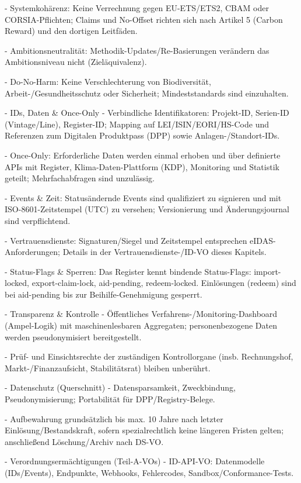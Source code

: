 \documentclass[12pt,a4paper]{scrartcl}
\begin{document}
- Systemkohärenz: Keine Verrechnung gegen EU-ETS/ETS2, CBAM oder CORSIA-Pflichten; Claims und No-Offset richten sich nach Artikel 5 (Carbon Reward) und den dortigen Leitfäden.

- Ambitionsneutralität: Methodik-Updates/Re-Basierungen verändern das Ambitionsniveau nicht (Zieläquivalenz).

- Do-No-Harm: Keine Verschlechterung von Biodiversität, Arbeit-/Gesundheitsschutz oder Sicherheit; Mindeststandards sind einzuhalten.

- IDs, Daten \& Once-Only
- Verbindliche Identifikatoren: Projekt-ID, Serien-ID (Vintage/Line), Register-ID; Mapping auf LEI/ISIN/EORI/HS-Code und Referenzen zum Digitalen Produktpass (DPP) sowie Anlagen-/Standort-IDs.

- Once-Only: Erforderliche Daten werden einmal erhoben und über definierte APIs mit Register, Klima-Daten-Plattform (KDP), Monitoring und Statistik geteilt; Mehrfachabfragen sind unzulässig.

- Events \& Zeit: Statusändernde Events sind qualifiziert zu signieren und mit ISO-8601-Zeitstempel (UTC) zu versehen; Versionierung und Änderungsjournal sind verpflichtend.

- Vertrauensdienste: Signaturen/Siegel und Zeitstempel entsprechen eIDAS-Anforderungen; Details in der Vertrauensdienste-/ID-VO dieses Kapitels.

- Status-Flags \& Sperren: Das Register kennt bindende Status-Flags: import-locked, export-claim-lock, aid-pending, redeem-locked. Einlösungen (redeem) sind bei aid-pending bis zur Beihilfe-Genehmigung gesperrt.

- Transparenz \& Kontrolle
- Öffentliches Verfahrens-/Monitoring-Dashboard (Ampel-Logik) mit maschinenlesbaren Aggregaten; personenbezogene Daten werden pseudonymisiert bereitgestellt.

- Prüf- und Einsichtsrechte der zuständigen Kontrollorgane (insb. Rechnungshof, Markt-/Finanzaufsicht, Stabilitätsrat) bleiben unberührt.

- Datenschutz (Querschnitt)
- Datensparsamkeit, Zweckbindung, Pseudonymisierung; Portabilität für DPP/Registry-Belege.

- Aufbewahrung grundsätzlich bis max. 10 Jahre nach letzter Einlösung/Bestandskraft, sofern spezialrechtlich keine längeren Fristen gelten; anschließend Löschung/Archiv nach DS-VO.

- Verordnungsermächtigungen (Teil-A-VOs)
- ID-API-VO: Datenmodelle (IDs/Events), Endpunkte, Webhooks, Fehlercodes, Sandbox/Conformance-Tests.
\end{document}
